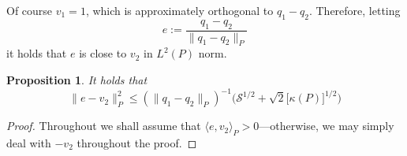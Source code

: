 \documentclass{article}
\newcommand{\1}{\mathbf{1}}
\newcommand{\Leb}{L}
\newcommand{\mc}[1]{\mathcal{#1}}
\newcommand{\dotp}[2]{\langle #1, #2 \rangle}
\theoremstyle{alden}
\theoremstyle{aldenthm}
\newtheorem{proposition}{Proposition}
\theoremstyle{definition}
\theoremstyle{remark}
\begin{document}
Of course $v_1 = 1$, which is approximately orthogonal to $q_1 - q_2$. Therefore, letting
\begin{equation*}
e := \frac{q_1 - q_2}{\|q_1 - q_2\|_P}
\end{equation*} 
it holds that $e$ is close to $v_2$ in $\Leb^2(P)$ norm.
\begin{proposition}
	It holds that
	\begin{equation}
	\label{eqn:l2_error}
	\|e - v_2\|_P^2 \leq (\|q_1 - q_2\|_P)^{-1}\Biggl(\mc{S}^{1/2} + \sqrt{2}\bigl[\kappa(P)\bigr]^{1/2} \Biggr)
	\end{equation}
\end{proposition}
\begin{proof}
	Throughout we shall assume that $\dotp{e}{v_2}_P > 0$---otherwise, we may simply deal with $-v_2$ throughout the proof.
	

\end{proof}
\end{document}
